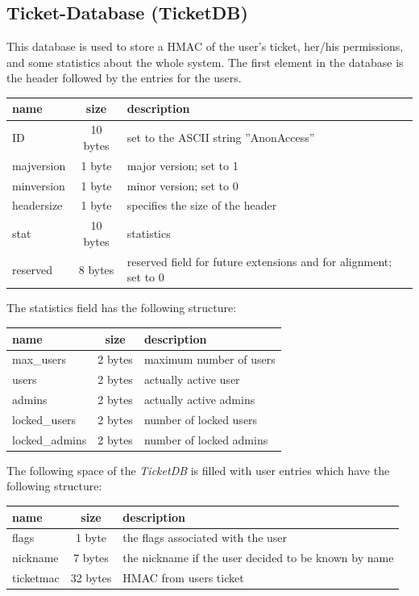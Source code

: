 
\subsection{Ticket-Database (TicketDB)}
This database is used to store a HMAC of the user's ticket, her/his permissions, and some statistics about the whole system.
The first element in the database is the header followed by the entries for the users.\\
\begin{tabular}{|l|c|p{8cm}|}\hline 
name & size & description \\ \hline
ID & 10 bytes & set to the ASCII string ''AnonAccess'' \\
majversion & 1 byte & major version; set to 1 \\
minversion & 1 byte & minor version; set to 0 \\
headersize & 1 byte & specifies the size of the header \\
stat & 10 bytes & statistics \\
reserved & 8 bytes & reserved field for future extensions and for alignment; set to 0 \\ \hline
\end{tabular} 

The statistics field has the following structure:\\
\begin{tabular}{|l|c|l|} \hline
name & size & description \\ \hline 
max\_users     & 2 bytes & maximum number of users \\
users          & 2 bytes & actually active user \\
admins         & 2 bytes & actually active admins \\
locked\_users  & 2 bytes & number of locked users \\
locked\_admins & 2 bytes & number of locked admins \\ \hline
\end{tabular} 

The following space of the \textit{TicketDB} is filled with user entries which have the following structure:\\
\begin{tabular}{|l|c|l|} \hline
name & size & description \\ \hline 
flags      &  1 byte  & the flags associated with the user \\
nickname   &  7 bytes & the nickname if the user decided to be known by name \\
ticketmac  & 32 bytes & HMAC from users ticket \\ \hline
\end{tabular} 


